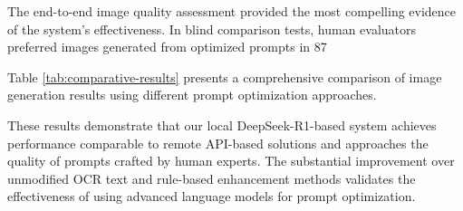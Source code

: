 The end-to-end image quality assessment provided the most compelling evidence of the system's effectiveness. In blind comparison tests, human evaluators preferred images generated from optimized prompts in 87%

Table \ref{tab:comparative-results} presents a comprehensive comparison of image generation results using different prompt optimization approaches.

\begin{center}
    
    \vspace{1pt}
    \label{tab:comparative-results}
\end{center}

These results demonstrate that our local DeepSeek-R1-based system achieves performance comparable to remote API-based solutions and approaches the quality of prompts crafted by human experts. The substantial improvement over unmodified OCR text and rule-based enhancement methods validates the effectiveness of using advanced language models for prompt optimization.

